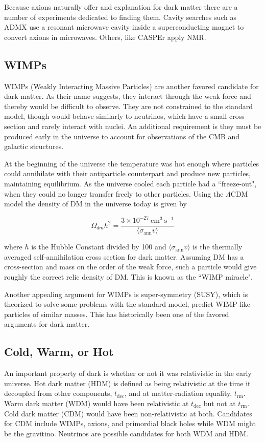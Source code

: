 Because axions naturally offer and explanation for dark matter there are a number of experiments dedicated to
finding them.  Cavity searches such as ADMX use a resonant microwave cavity inside a superconducting magnet
to convert axions in microwaves.  Others, like CASPEr apply NMR.


\subsection{WIMPs} \label{subsec:wimps}
WIMPs (Weakly Interacting Massive Particles) are another favored candidate for dark matter.  As their name
suggests, they interact through the weak force and thereby would be difficult to observe.  They
are not constrained to the standard model, though would behave similarly
to neutrinos, which have a small cross-section and rarely interact with nuclei.  An additional requirement
is they must be produced early in the universe to account for observations of the CMB and galactic
structures.

At the beginning of the universe the temperature was hot enough where particles could annihilate with their
antiparticle counterpart and produce new particles, maintaining equilibrium.  As the universe cooled each
particle had a ``freeze-out", when they could no longer transfer freely to other particles.  Using the
$\Lambda$CDM model the density of DM in the universe today is given by

\begin{equation}
\Omega_{dm}h^{2} = \frac{3 \times 10^{-27}\ \mathrm{cm^{3}\ s^{-1}}}{\langle \sigma_{\mathrm{ann}} v \rangle}
\end{equation}

\noindent where $h$ is the Hubble Constant divided by 100 and $\langle \sigma_{\mathrm{ann}} v \rangle$ is
the thermally averaged self-annihilation cross section
for dark matter.  Assuming DM has a cross-section and mass on the order of the weak force, such a
particle would give roughly the correct relic density of DM.  This is known as the ``WIMP miracle".

Another appealing argument for WIMPs is super-symmetry (SUSY), which is theorized to solve some problems
with the standard model,
predict WIMP-like particles of similar masses.  This has historically been one of the favored arguments
for dark matter.

\subsection{Cold, Warm, or Hot} \label{subsec:hot_vs_cold}
An important property of dark is whether or not it was relativistic in the early universe.  Hot dark matter (HDM)
is defined as being relativistic at the time it decoupled from other components, $t_{\mathrm{dec}}$, and at
matter-radiation equality, $t_{\mathrm{rm}}$.  Warm dark matter (WDM) would have been relativistic at $t_{\mathrm{dec}}$
but not at $t_{\mathrm{rm}}$.  Cold dark matter (CDM) would have been non-relativistic at both.  Candidates for CDM include
WIMPs, axions, and primordial black holes while WDM might be the gravitino.  Neutrinos are possible candidates for both
WDM and HDM.

